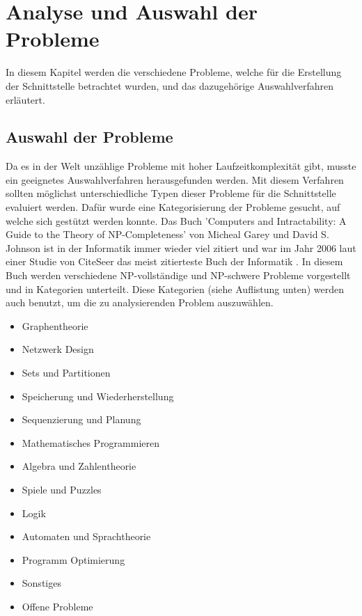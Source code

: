 %
%

\chapter{Analyse und Auswahl der Probleme \resultAssignment{[R1]}}\label{chap.problemauswahl}
In diesem Kapitel werden die verschiedene Probleme, welche für die Erstellung der Schnittstelle betrachtet wurden, und das dazugehörige Auswahlverfahren erläutert.

\section{Auswahl der Probleme}\label{cat_theo_inf}
Da es in der Welt unzählige Probleme mit hoher Laufzeitkomplexität gibt, musste ein geeignetes Auswahlverfahren herausgefunden werden. Mit diesem Verfahren sollten möglichst unterschiedliche 
Typen dieser Probleme für die Schnittstelle evaluiert werden. Dafür wurde eine Kategorisierung der Probleme gesucht, auf welche sich gestützt werden konnte. Das Buch 
'Computers and Intractability: A Guide to the Theory of NP-Completeness' \cite{garey1979computers} von Micheal Garey und David S. Johnson ist in der Informatik immer wieder viel zitiert und 
war im Jahr 2006 laut einer Studie von CiteSeer das meist zitierteste Buch der Informatik \cite{citeseer_algo_buch}. In diesem Buch werden verschiedene NP-vollständige und NP-schwere 
Probleme vorgestellt und in Kategorien unterteilt. Diese Kategorien (siehe Auflistung unten) werden auch benutzt, um die zu analysierenden Problem auszuwählen.

\begin{itemize}
	\item Graphentheorie
	\item Netzwerk Design
	\item Sets und Partitionen
	\item Speicherung und Wiederherstellung
	\item Sequenzierung und Planung
	\item Mathematisches Programmieren
	\item Algebra und Zahlentheorie
	\item Spiele und Puzzles
	\item Logik
	\item Automaten und Sprachtheorie
	\item Programm Optimierung
	\item Sonstiges
	\item Offene Probleme
\end{itemize}

